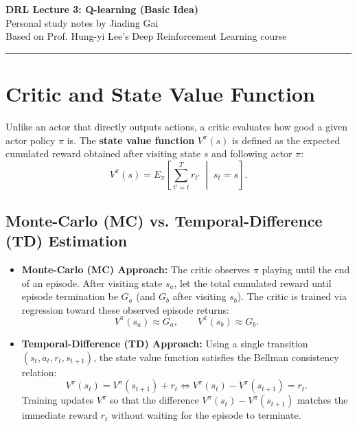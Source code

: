 \documentclass[11pt, a4paper]{article}
\begin{document}
\begin{center}
    {\LARGE \textbf{\textcolor{accent}{DRL Lecture 3: Q-learning (Basic Idea)}}}\\[6pt]
    {\large Personal study notes by Jiading Gai}\\[4pt]
    {\small \textcolor{muted}{Based on Prof. Hung-yi Lee's Deep Reinforcement Learning course}}
\end{center}

\vspace{6pt}
\hrule
\vspace{12pt}

\section{Critic and State Value Function}

Unlike an actor that directly outputs actions, a critic evaluates how good a given actor policy $\pi$ is. The \textbf{state value function} $V^\pi(s)$ is defined as the expected cumulated reward obtained after visiting state $s$ and following actor $\pi$:
\begin{equation}\label{eq:q-state-value}
    V^\pi(s) = E_\pi\left[\sum_{t'=t}^{T} r_{t'} \;\middle|\; s_t = s\right].
\end{equation}

\subsection*{Monte-Carlo (MC) vs. Temporal-Difference (TD) Estimation}

\begin{itemize}
    \item \textbf{Monte-Carlo (MC) Approach:} The critic observes $\pi$ playing until the end of an episode. After visiting state $s_a$, let the total cumulated reward until episode termination be $G_a$ (and $G_b$ after visiting $s_b$). The critic is trained via regression toward these observed episode returns:
    \begin{equation}\label{eq:q-monte-carlo-value}
        V^\pi(s_a) \approx G_a, \qquad V^\pi(s_b) \approx G_b.
    \end{equation}

    \item \textbf{Temporal-Difference (TD) Approach:} Using a single transition $(s_t, a_t, r_t, s_{t+1})$, the state value function satisfies the Bellman consistency relation:
    \begin{equation}\label{eq:q-td-value-relation}
        V^\pi(s_t) = V^\pi(s_{t+1}) + r_t \iff V^\pi(s_t) - V^\pi(s_{t+1}) = r_t.
    \end{equation}
    Training updates $V^\pi$ so that the difference $V^\pi(s_t) - V^\pi(s_{t+1})$ matches the immediate reward $r_t$ without waiting for the episode to terminate.
\end{itemize}
\end{document}
